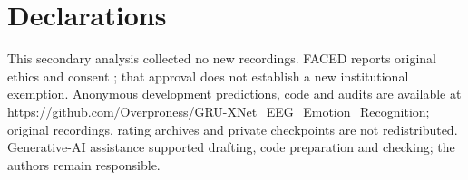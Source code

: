 \documentclass[11pt,a4paper]{article}
\begin{document}
\section*{Declarations}
This secondary analysis collected no new recordings. FACED reports original ethics and consent \cite{chen2023faced}; that approval does not establish a new institutional exemption. Anonymous development predictions, code and audits are available at \url{https://github.com/Overproness/GRU-XNet_EEG_Emotion_Recognition}; original recordings, rating archives and private checkpoints are not redistributed. Generative-AI assistance supported drafting, code preparation and checking; the authors remain responsible.


\begingroup
{}
\small
\setlength{\bibsep}{3pt}

\endgroup
\end{document}
